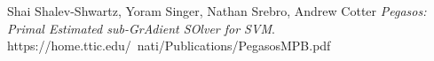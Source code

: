 \documentclass[a4paper]{article}
\begin{document}
\clearpage\null\newpage


\newpage







\begin{thebibliography}{unsrt}

    Shai Shalev-Shwartz, Yoram Singer, Nathan Srebro, Andrew Cotter \emph{Pegasos: Primal Estimated sub-GrAdient SOlver for SVM}. https://home.ttic.edu/~nati/Publications/PegasosMPB.pdf
    
\end{thebibliography}
\end{document}
